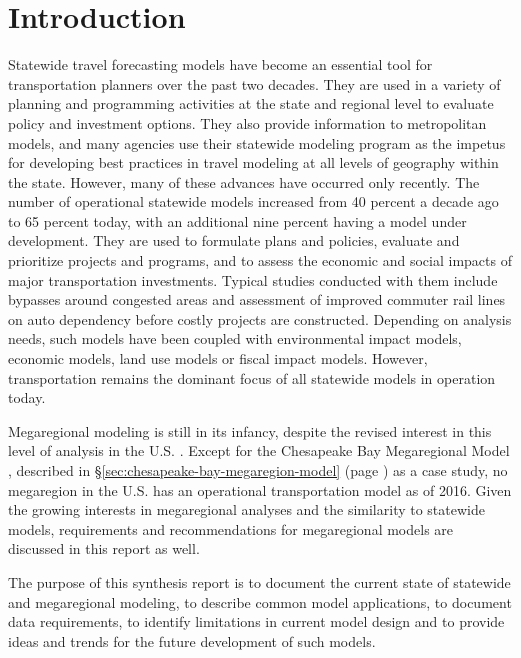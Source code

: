 \chapter{Introduction}\label{sec:introduction}

Statewide travel forecasting models have become an essential tool for transportation planners over the past two decades. They are used in a variety of planning and programming activities at the state and regional level to evaluate policy and investment options. They also provide information to metropolitan models, and many agencies use their statewide modeling program as the impetus for developing best practices in travel modeling at all levels of geography within the state. However, many of these advances have occurred only recently. The number of operational statewide models increased from 40 percent a decade ago \citep{horowitz06} to 65 percent today, with an additional nine percent having a model under development. They are used to formulate plans and policies, evaluate and prioritize projects and programs, and to assess the economic and social impacts of major transportation investments. Typical studies conducted with them include bypasses around congested areas and assessment of improved commuter rail lines on auto dependency before costly projects are constructed. Depending on analysis needs, such models have been coupled with environmental impact models, economic models, land use models or fiscal impact models. However, transportation remains the dominant focus of all statewide models in operation today.

Megaregional modeling is still in its infancy, despite the revised interest in this level of analysis in the U.S. \citep{amekudzi07, florida08}. Except for the Chesapeake Bay Megaregional Model \citep{moeckel15b}, described in \S\ref{sec:chesapeake-bay-megaregion-model} (page \pageref{sec:chesapeake-bay-megaregion-model}) as a case study, no megaregion in the U.S. has an operational transportation model as of 2016. Given the growing interests in megaregional analyses and the similarity to statewide models, requirements and recommendations for megaregional models are discussed in this report as well.

The purpose of this synthesis report is to document the current state of statewide and megaregional modeling, to describe common model applications, to document data requirements, to identify limitations in current model design and to provide ideas and trends for the future development of such models.

